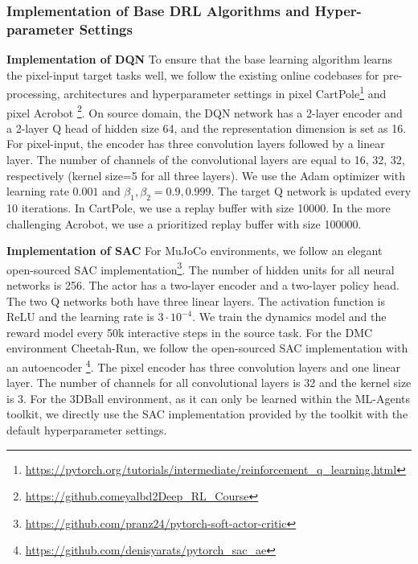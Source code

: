 \subsubsection{Implementation of Base DRL Algorithms and Hyper-parameter Settings}
\label{app:exp_drl}

\textbf{Implementation of DQN}\quad
To ensure that the base learning algorithm learns the pixel-input target tasks well, we follow the existing online codebases for pre-processing, architectures and hyperparameter settings in pixel CartPole\footnote{\href{https://pytorch.org/tutorials/intermediate/reinforcement_q_learning.html}{https://pytorch.org/tutorials/intermediate/reinforcement\_q\_learning.html}} and pixel Acrobot
\footnote{\href{https://github.com/eyalbd2/Deep_RL_Course }{https://github.com\/eyalbd2\/Deep\_RL\_Course}}. On source domain, the DQN network has a 2-layer encoder and a 2-layer Q head of hidden size 64, and the representation dimension is set as 16. For pixel-input, the encoder has three convolution layers followed by a linear layer. The number of channels of the convolutional layers are equal to 16, 32, 32, respectively (kernel size=5 for all three layers). We use the Adam optimizer with learning rate $0.001$ and $\beta_1, \beta_2=0.9,0.999$. The target Q network is updated every 10 iterations.
In CartPole, we use a replay buffer with size 10000. In the more challenging Acrobot, we use a prioritized replay buffer with size 100000.

\textbf{Implementation of SAC}\quad
For MuJoCo environments, we follow an elegant open-sourced SAC implementation\footnote{\href{https://github.com/pranz24/pytorch-soft-actor-critic}{https://github.com/pranz24/pytorch-soft-actor-critic}}.
The number of hidden units for all neural networks is 256.
The actor has a two-layer encoder and a two-layer policy head.
The two Q networks both have three linear layers.
The activation function is ReLU and the learning rate is $3\cdot 10^{-4}$.
We train the dynamics model and the reward model every 50k interactive steps in the source task.
For the DMC environment Cheetah-Run, we follow the open-sourced SAC implementation with an autoencoder \footnote{\href{https://github.com/denisyarats/pytorch_sac_ae}{https://github.com/denisyarats/pytorch\_sac\_ae}}.
The pixel encoder has three convolution layers and one linear layer. The number of channels for all convolutional layers is 32 and the kernel size is 3.
For the 3DBall environment, as it can only be learned within the ML-Agents toolkit, we directly use the SAC implementation provided by the toolkit with the default hyperparameter settings. 


